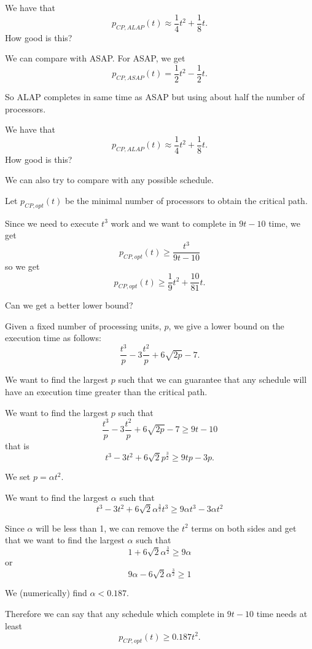 \begin{frame}

We have that
$$ p_{CP,ALAP}(t) \approx \frac{1}{4}t^2 +\frac{1}{8}t .$$
How good is this?

We can compare with ASAP. For ASAP, we get
$$ p_{CP,ASAP}(t) = \frac{1}{2}t^2 -\frac{1}{2}t .$$

So ALAP completes in same time as ASAP but using about half the number of processors.


\end{frame}



\begin{frame}

We have that
$$ p_{CP,ALAP}(t) \approx \frac{1}{4}t^2 +\frac{1}{8}t .$$
How good is this?

We can also try to compare with any possible schedule.

Let $p_{CP,opt}(t)$ be the minimal number of processors to obtain the critical path.

Since we need to execute $t^3$ work and we want to complete in $9t-10$ time, we get
$$ p_{CP,opt}(t) \geq \frac{t^3}{9t-10}$$
so we get
$$ p_{CP,opt}(t) \geq \frac{1}{9}t^2+\frac{10}{81}t.$$

Can we get a better lower bound?



\end{frame}




\begin{frame}
\scriptsize

Given a fixed number of 
processing units, $p$, we give a lower bound on the execution time as follows:
$$\frac{t^{3}}{p} - 3\frac{t^2}{p} + 6\sqrt{2p} - 7.$$

We want to find the largest $p$ such that we can guarantee that any schedule will have an execution time greater than the critical path.

We want to find the largest $p$ such that
$$\frac{t^{3}}{p} - 3\frac{t^2}{p} + 6\sqrt{2p} - 7 \geq 9t - 10 $$
that is
$$ t^{3} - 3t^2 + 6\sqrt{2}p^{\frac{3}{2}}  \geq 9tp - 3p. $$

We set $p=\alpha t^2$.

We want to find the largest $\alpha$ such that
$$ t^{3} - 3t^2 + 6\sqrt{2}\alpha^{\frac{3}{2}} t^3  \geq 9\alpha t^3 - 3\alpha t^2 $$

Since $\alpha$ will be less than 1, we can remove the $t^2$ terms on both sides and get
that 
we want to find the largest $\alpha$ such that
$$ 1 + 6\sqrt{2}\alpha^{\frac{3}{2}}   \geq 9\alpha  $$
or 
$$  9\alpha  - 6\sqrt{2}\alpha^{\frac{3}{2}}  \geq 1 $$

We (numerically) find $\alpha < 0.187$.

Therefore we can say that any schedule which complete in $9t-10$ time needs at least 
$$ p_{CP,opt}(t) \geq 0.187 t^2.$$



\end{frame}




